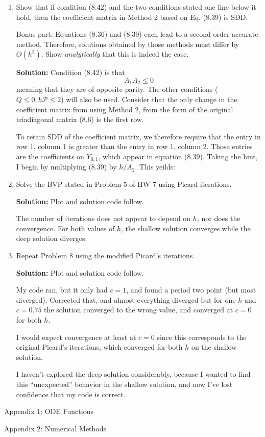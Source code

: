 \documentclass[11pt]{article}
\newcommand{\oh}[1]{O(h^{{#1}})}
\begin{document}
\begin{enumerate}
\item Show that if condition (8.42) and the two conditions stated one line below it hold, then the coefficient matrix in Method 2 based on Eq. (8.39) is SDD.

Bonus part: Equations (8.36) and (8.39) each lead to a second-order accurate method.
Therefore, solutions obtained by those methods must differ by $\oh{3}$.
Show {\em analytically} that this is indeed the case.

\bigskip
\textbf{Solution:} Condition (8.42) is that 
\[ A_1 A_2 \leq 0 \]
meaning that they are of opposite parity.
The other conditions ($Q \leq 0, h\mathcal{P} \leq 2$) will also be used.
Consider that the only change in the coefficient matrix from using Method 2, from the form of the original triadiagonal matrix (8.6) is the first row.

To retain SDD of the coefficient matrix, we therefore require that the entry in row 1, column 1 is greater than the entry in row 1, column 2.
Those entries are the coefficients on $Y_{0,1}$, which appear in equation (8.39).
Taking the hint, I begin by multiplying (8.39) by $h/A_2$.
This yeilds:

\item Solve the BVP stated in Problem 5 of HW 7 using Picard iterations.

\bigskip
\textbf{Solution:} Plot and solution code follow.

The number of iterations does not appear to depend on $h$, nor does the convergence.
For both values of $h$, the shallow solution converges while the deep solution diverges.


\item Repeat Problem 8 using the modified Picard's iterations.

\bigskip
\textbf{Solution:} Plot and solution code follow.

My code ran, but it only had $c=1$, and found a period two point (but most diverged).
Corrected that, and almost everything diverged but for one $h$ and $c = 0.75$ the solution converged to the wrong value, and converged at $c=0$ for both $h$.

I would expect convergence at least at $c=0$ since this corresponds to the original Picard's iterations, which converged for both $h$ on the shallow solution.

I haven't explored the deep solution considerably, because I wanted to find this ``unexpected'' behavior in the shallow solution, and now I've lost confidence that my code is correct.

\end{enumerate}

\clearpage
\pagebreak
{\huge Appendix 1: ODE Functions}

\clearpage
\pagebreak
{\huge Appendix 2: Numerical Methods}

\end{document}
